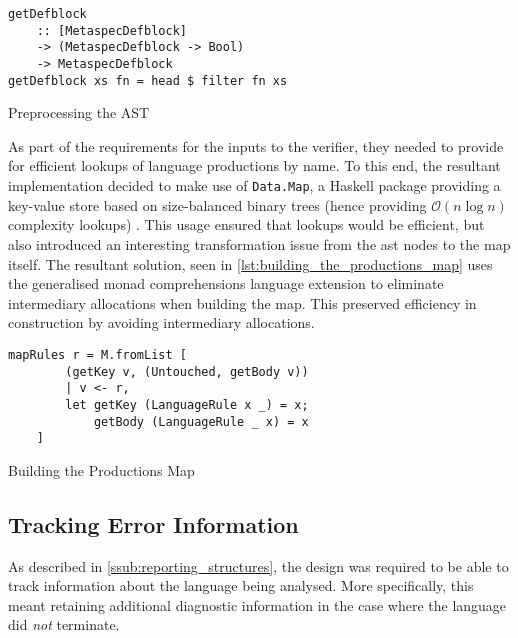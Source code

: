 \begin{listing}[!htb]
\begin{verbatim}
getDefblock
    :: [MetaspecDefblock]
    -> (MetaspecDefblock -> Bool)
    -> MetaspecDefblock
getDefblock xs fn = head $ filter fn xs
\end{verbatim}
\caption{Preprocessing the AST}
\label{lst:preprocessing_the_ast}
\end{listing}

As part of the requirements for the inputs to the verifier, they needed to provide for efficient lookups of language productions by name. 
To this end, the resultant implementation decided to make use of \texttt{Data.Map}, a Haskell package providing a key-value store based on size-balanced binary trees (hence providing $\mathcal{O}(n \log n)$ complexity lookups) \citep{data_map}.
This usage ensured that lookups would be efficient, but also introduced an interesting transformation issue from the \gls{ast} nodes to the map itself.
The resultant solution, seen in \autoref{lst:building_the_productions_map} uses the generalised monad comprehensions language extension to eliminate intermediary allocations when building the map. 
This preserved efficiency in construction by avoiding intermediary allocations.

\begin{listing}[!htb]
\begin{verbatim}
mapRules r = M.fromList [
        (getKey v, (Untouched, getBody v))
        | v <- r,
        let getKey (LanguageRule x _) = x;
            getBody (LanguageRule _ x) = x
    ]
\end{verbatim}
\caption{Building the Productions Map}
\label{lst:building_the_productions_map}
\end{listing} 


\subsection{Tracking Error Information} %
\label{sub:tracking_error_information}
As described in \autoref{ssub:reporting_structures}, the design was required to be able to track information about the language being analysed.
More specifically, this meant retaining additional diagnostic information in the case where the language did \textit{not} terminate.\\


